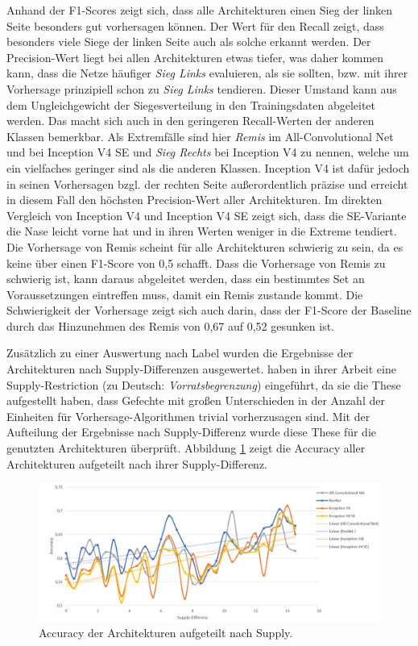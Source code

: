 Anhand der F1-Scores zeigt sich, dass alle Architekturen einen Sieg
der linken Seite besonders gut vorhersagen können. Der Wert für den Recall zeigt, dass besonders viele Siege der linken Seite auch als solche erkannt werden. Der Precision-Wert liegt bei allen Architekturen etwas tiefer, was daher kommen kann, dass die Netze häufiger \textit{Sieg Links} evaluieren, als sie sollten, bzw. mit ihrer Vorhersage prinzipiell schon zu \textit{Sieg Links} tendieren. Dieser Umstand kann aus dem Ungleichgewicht der Siegesverteilung in den Trainingsdaten abgeleitet werden. Das macht sich auch in den geringeren Recall-Werten der anderen Klassen bemerkbar. Als Extremfälle sind hier \textit{Remis} im All-Convolutional Net und bei Inception V4 SE und \textit{Sieg Rechts} bei Inception V4 zu nennen, welche um ein vielfaches geringer sind als die anderen Klassen. Inception V4 ist dafür jedoch in seinen Vorhersagen bzgl. der rechten Seite außerordentlich präzise und erreicht in diesem Fall den höchsten Precision-Wert aller Architekturen. Im direkten Vergleich von Inception V4 und Inception V4 SE zeigt sich, dass die SE-Variante die Nase leicht vorne hat und in ihren Werten weniger in die Extreme tendiert. Die Vorhersage von Remis scheint für alle Architekturen schwierig zu sein, da es keine über einen F1-Score von 0,5 schafft. Dass die Vorhersage von Remis zu schwierig ist, kann daraus abgeleitet werden, dass ein bestimmtes Set an Voraussetzungen eintreffen muss, damit ein Remis zustande kommt. Die Schwierigkeit der Vorhersage zeigt sich auch darin, dass der F1-Score der Baseline durch das Hinzunehmen des Remis von 0,67 auf 0,52 gesunken ist. 

Zusätzlich zu einer Auswertung nach Label wurden die Ergebnisse der Architekturen nach Supply-Differenzen ausgewertet. \textcite{AIIDE137381} haben in ihrer Arbeit eine Supply-Restriction (zu Deutsch: \textit{Vorratsbegrenzung}) eingeführt, da sie die These aufgestellt haben, dass Gefechte mit großen Unterschieden in der Anzahl der Einheiten für Vorhersage-Algorithmen trivial vorherzusagen sind. Mit der Aufteilung der Ergebnisse nach Supply-Differenz wurde diese These für die genutzten Architekturen überprüft. Abbildung \ref{fig:supp_diff_archs} zeigt die Accuracy aller Architekturen aufgeteilt nach ihrer Supply-Differenz.

\begin{figure}[H]
\centering
\includegraphics[scale=0.45]{pictures/Auswertung/acc_by_supp}
\caption{Accuracy der Architekturen aufgeteilt nach Supply.}
\label{fig:supp_diff_archs}
\end{figure}

